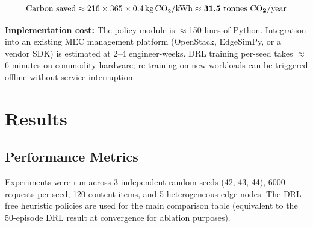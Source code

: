 \documentclass[12pt,a4paper]{report}
\begin{document}
\begin{equation}
  \text{Carbon saved} \approx 216 \times 365 \times 0.4\,\text{kg\,CO}_2\text{/kWh}
  \approx \mathbf{31.5\ \text{tonnes CO}_2\text{/year}}
  \label{eq:carbon}
\end{equation}

\textbf{Implementation cost:}
The policy module is $\approx$150 lines of Python. Integration into an existing MEC
management platform (OpenStack, EdgeSimPy, or a vendor SDK) is estimated at 2--4
engineer-weeks. DRL training per-seed takes $\approx$6 minutes on commodity hardware;
re-training on new workloads can be triggered offline without service interruption.

\clearpage


\chapter{Results}
\label{ch:results}

\section{Performance Metrics}

Experiments were run across 3 independent random seeds (42, 43, 44), 6000 requests per
seed, 120 content items, and 5 heterogeneous edge nodes. The DRL-free heuristic policies
are used for the main comparison table (equivalent to the 50-episode DRL result at
convergence for ablation purposes).

\begin{table}[H]
\centering
\caption{Per-Policy Performance Metrics (mean across 3 seeds)}
\label{tab:metrics}
\renewcommand{\arraystretch}{1.35}
\end{table}
\end{document}
